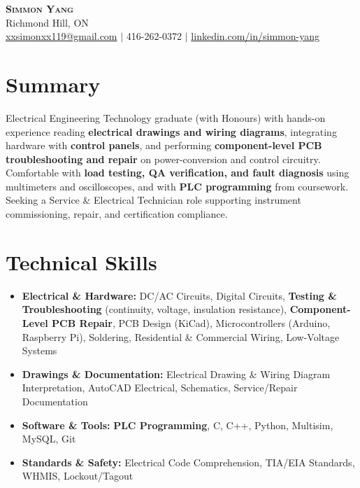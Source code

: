 \documentclass[letterpaper,11pt]{article}
\begin{document}
\begin{center}
    \textbf{\Huge \scshape Simmon Yang} \\ \vspace{1pt}
    Richmond Hill, ON \\
    \href{mailto:xxsimonxx119@gmail.com}{xxsimonxx119@gmail.com} $|$ 416-262-0372 $|$
    \href{https://www.linkedin.com/in/simmon-yang/}{linkedin.com/in/simmon-yang}
\end{center}

\section{Summary}
Electrical Engineering Technology graduate (with Honours) with hands-on experience reading \textbf{electrical drawings and wiring diagrams}, integrating hardware with \textbf{control panels}, and performing \textbf{component-level PCB troubleshooting and repair} on power-conversion and control circuitry. Comfortable with \textbf{load testing, QA verification, and fault diagnosis} using multimeters and oscilloscopes, and with \textbf{PLC programming} from coursework. Seeking a Service \& Electrical Technician role supporting instrument commissioning, repair, and certification compliance.

\section{Technical Skills}
\begin{itemize}[leftmargin=0.15in]
  \item \textbf{Electrical \& Hardware:} DC/AC Circuits, Digital Circuits, \textbf{Testing \& Troubleshooting} (continuity, voltage, insulation resistance), \textbf{Component-Level PCB Repair}, PCB Design (KiCad), Microcontrollers (Arduino, Raspberry Pi), Soldering, Residential \& Commercial Wiring, Low-Voltage Systems
  \item \textbf{Drawings \& Documentation:} Electrical Drawing \& Wiring Diagram Interpretation, AutoCAD Electrical, Schematics, Service/Repair Documentation
  \item \textbf{Software \& Tools:} \textbf{PLC Programming}, C, C++, Python, Multisim, MySQL, Git
  \item \textbf{Standards \& Safety:} Electrical Code Comprehension, TIA/EIA Standards, WHMIS, Lockout/Tagout
\end{itemize}
\end{document}
